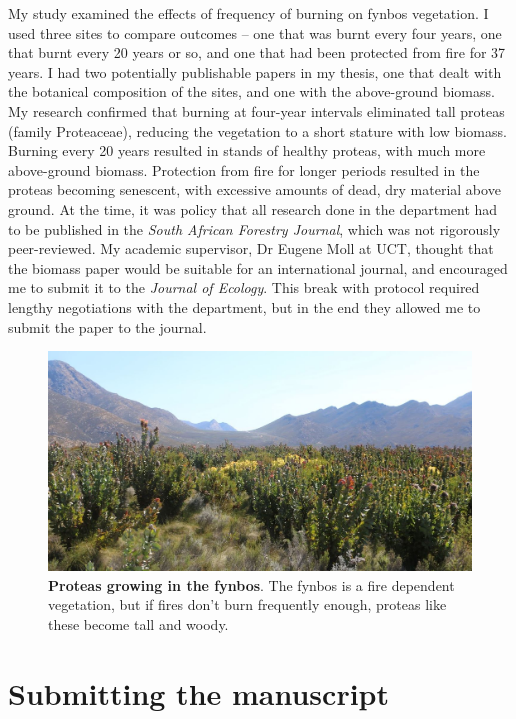 \documentclass[
]{krantz}
\begin{document}
My study examined the effects of frequency of burning on fynbos vegetation. I used three sites to compare outcomes -- one that was burnt every four years, one that burnt every 20 years or so, and one that had been protected from fire for 37 years. I had two potentially publishable papers in my thesis, one that dealt with the botanical composition of the sites, and one with the above-ground biomass. My research confirmed that burning at four-year intervals eliminated tall proteas (family Proteaceae), reducing the vegetation to a short stature with low biomass. Burning every 20 years resulted in stands of healthy proteas, with much more above-ground biomass. Protection from fire for longer periods resulted in the proteas becoming senescent, with excessive amounts of dead, dry material above ground. At the time, it was policy that all research done in the department had to be published in the \emph{South African Forestry Journal}, which was not rigorously peer-reviewed. My academic supervisor, Dr Eugene Moll at UCT, thought that the biomass paper would be suitable for an international journal, and encouraged me to submit it to the \emph{Journal of Ecology}. This break with protocol required lengthy negotiations with the department, but in the end they allowed me to submit the paper to the journal.



\begin{figure}
\includegraphics[width=0.95\linewidth]{figures/proteas-in-fynbos} \caption{\textbf{Proteas growing in the fynbos}. The fynbos is a fire dependent vegetation, but if fires don't burn frequently enough, proteas like these become tall and woody.}\label{fig:proteas-in-fynbos}
\end{figure}

\hypertarget{submitting-the-manuscript-1}{%
\section{Submitting the manuscript}\label{submitting-the-manuscript-1}}
\end{document}
